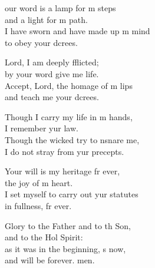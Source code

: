 \settowidth{\versewidth}{I set myself to carry out your statutes *}
\begin{psalmverse}%
  \begin{patverse}
our word is a lamp for m steps\Med\\
and a light for m path.\\
I have sworn and have made up m mind\Med\\
to obey your dcrees.

Lord, I am deeply fflicted;\Med\\
by your word give me life.\\
Accept, Lord, the homage of m lips\Med\\
and teach me your dcrees.

Though I carry my life in m hands,\Med\\
I remember yur law.\\
Though the wicked try to nsnare me,\Med\\
I do not stray from yur precepts.

Your will is my heritage fr ever,\Med\\
the joy of m heart.\\
I set myself to carry out yur statutes\Med\\
in fullness, fr ever.

Glory to the Father and to th Son,\Med\\
and to the Hol Spirit:\\
as it was in the beginning, \pointup{\i}s now,\Med\\
and will be forever. men. 
  \end{patverse}
\end{psalmverse}
